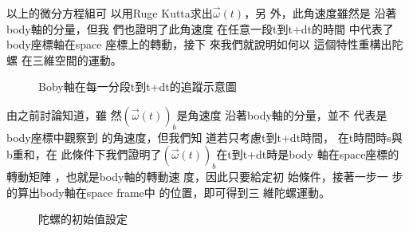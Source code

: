 \documentclass[12pt,a4paper]{article}
\begin{document}
以上的微分方程組可%
以用Ruge Kutta求出$\vec{\omega}(t)$，另%
外，此角速度雖然是%
沿著body軸的分量，但我%
們也證明了此角速度%
在任意一段t到t+dt的時間%
中代表了body座標軸在space%
座標上的轉動，接下%
來我們就說明如何以%
這個特性重構出陀螺%
在三維空間的運動。%
\bigskip 

\begin{figure}
[th]
\caption{Boby軸在每一分段t到t+dt的追蹤示意圖}
\begin{center}
\end{center}
\end{figure}


由之前討論知道，雖%
然$\left( \vec{\omega}(t)\right) _{b}$是角速度%
沿著body軸的分量，並不%
代表是body座標中觀察到%
的角速度，但我們知%
道若只考慮t到t+dt時間，%
在t時間時s與b重和，在%
此條件下我們證明了$%
\left( \vec{\omega}(t)\right) _{b}$在t到t+dt時是body%
軸在space座標的轉動矩陣%
，也就是body軸的轉動速%
度，因此只要給定初%
始條件，接著一步一%
步的算出body軸在space frame中%
的位置，即可得到三%
維陀螺運動。\bigskip


\begin{figure}
[th]
\caption{陀螺的初始值設定}
\begin{center}
\end{center}
\end{figure}
\end{document}
